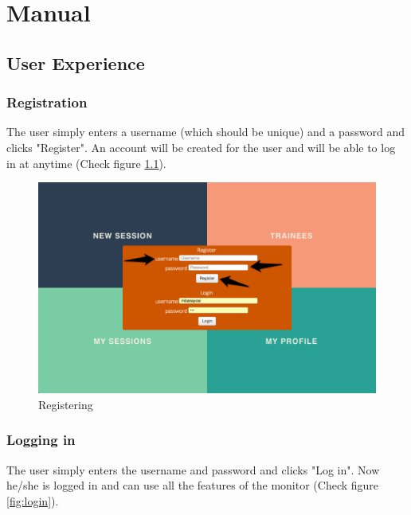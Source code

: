 \chapter{Manual}\label{chap:manual}

\section{User Experience}

\subsection{Registration}
The user simply enters a username (which should be unique) and a password and clicks "Register". An account will be created for the user and will be able to log in at anytime (Check figure \ref{fig:registering}).

\begin{figure}[htbp]
\centering 
\includegraphics[width=1.0\linewidth]{steps/Register} 
\caption{Registering} 
\label{fig:registering} 
\end{figure} 

\subsection{Logging in}
The user simply enters the username and password and clicks "Log in". Now he/she is logged in and can use all the features of the monitor (Check figure \ref{fig:login}).

